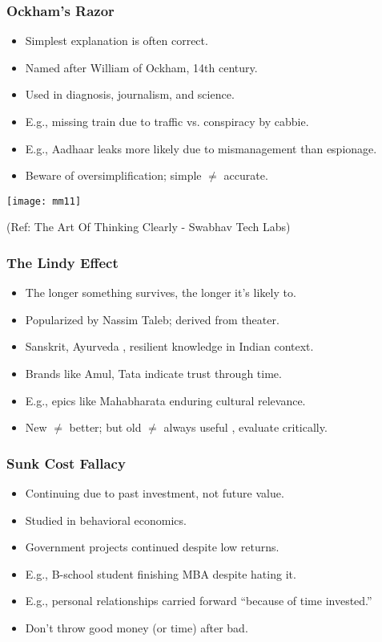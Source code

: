 \begin{frame}[fragile]\frametitle{Ockham's Razor}
  \begin{itemize}
    \item Simplest explanation is often correct.
    \item Named after William of Ockham, 14th century.
    \item Used in diagnosis, journalism, and science.
    \item E.g., missing train due to traffic vs. conspiracy by cabbie.
    \item E.g., Aadhaar leaks more likely due to mismanagement than espionage.
    \item Beware of oversimplification; simple $\neq$ accurate.
  \end{itemize}
  
	\begin{center}
	\texttt{[image: mm11]}
	\end{center}
	
{\tiny (Ref: The Art Of Thinking Clearly - Swabhav Tech Labs)}     
\end{frame}

\begin{frame}[fragile]\frametitle{The Lindy Effect}
  \begin{itemize}
    \item The longer something survives, the longer it's likely to.
    \item Popularized by Nassim Taleb; derived from theater.
    \item Sanskrit, Ayurveda , resilient knowledge in Indian context.
    \item Brands like Amul, Tata indicate trust through time.
    \item E.g., epics like Mahabharata enduring cultural relevance.
    \item New $\neq$ better; but old $\neq$ always useful , evaluate critically.
  \end{itemize}
\end{frame}

\begin{frame}[fragile]\frametitle{Sunk Cost Fallacy}
  \begin{itemize}
    \item Continuing due to past investment, not future value.
    \item Studied in behavioral economics.
    \item Government projects continued despite low returns.
    \item E.g., B-school student finishing MBA despite hating it.
    \item E.g., personal relationships carried forward ``because of time invested.''
    \item Don't throw good money (or time) after bad.
  \end{itemize}
\end{frame}

